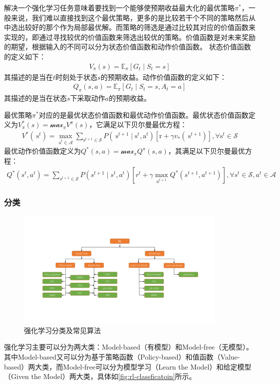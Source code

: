     解决一个强化学习任务意味着要找到一个能够使预期收益最大化的最优策略$\pi^*$，一般来说，我们难以直接找到这个最优策略，更多的是比较若干个不同的策略然后从中选出较好的那个作为局部最优解。而策略的筛选是通过比较其对应的价值函数来实现的，即通过寻找较优的价值函数来筛选出较优的策略。价值函数是对未来奖励的期望，根据输入的不同可以分为状态价值函数和动作价值函数。
状态价值函数的定义如下：
\begin{align}
    V_{\pi}(s)=\mathbb{E}_{\pi}\left[G_{t} \mid S_{t}=s\right]
\end{align}
其描述的是当在$t$时刻处于状态$s$的预期收益。动作价值函数的定义如下：
\begin{align}
    Q_{\pi}(s, a)=\mathbb{E}_{\pi}\left[G_{t} \mid S_{t}=s, A_{t}=a\right]
\end{align}
其描述的是当在状态$s$下采取动作$a$的预期收益。

最优策略$\pi^{*}$对应的是最优状态价值函数和最优动作价值函数。最优状态价值函数定义为$V_{\pi}^*(s)=\mathcal{max}_{\pi}V^{\pi}(s)$，它满足以下贝尔曼最优方程：
\begin{align}
    V^{*}\left(\mathrm{~s}^{t}\right)=\max _{\mathrm{a}^{t} \in \mathcal{A}} \sum_{\mathrm{s}^{t+1} \in \mathcal{S}} P\left(\mathrm{~s}^{t+1} \mid \mathrm{s}^{t}, \mathrm{a}^{t}\right)\left[\mathrm{r}+\gamma v_{*}\left(\mathrm{~s}^{t+1}\right)\right], \forall \mathrm{s}^{t} \in \mathcal{S}
\end{align}
最优动作价值函数定义为$Q^*(s,a)=\mathcal{max}_{\pi}Q^{\pi}(s,a)$，其满足以下贝尔曼最优方程：
\begin{align}
    Q^{*}\left(s^{t}, a^{t}\right)=\sum_{s^{t+1} \in \mathcal{S}} P\left(s^{t+1} \mid s^{t}, a^{t}\right)\left[r^{t}+\gamma \max _{a^{t+1}} Q^{*}\left(s^{t+1}, a^{t+1}\right)\right], \forall s^{t} \in \mathcal{S}, a^{t} \in \mathcal{A}
\end{align}

\subsubsection{分类}
\begin{figure}[htb]
    \includegraphics[width=0.9\textwidth]{fig/rl-classfication.pdf}
    \caption{强化学习分类及常见算法}
    \label{fig:rl-classficatoin}
\end{figure}
强化学习主要可以分为两大类：Model-based（有模型）和Model-free（无模型）。其中Model-based又可以分为基于策略函数（Policy-based）和值函数（Value-based）两大类，而Model-free可以分为模型学习（Learn the Model）和给定模型（Given the Model）两大类，具体如\autoref{fig:rl-classficatoin}所示。

